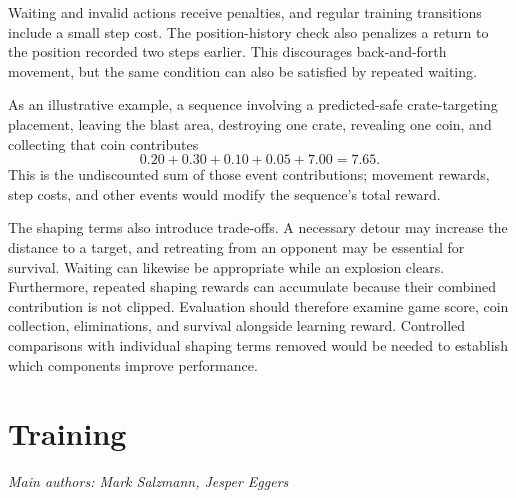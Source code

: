 \documentclass[11pt,a4paper]{article}
\newcommand{\contributionauthors}[1]{{\small\textit{Main authors: #1}\par}}
\begin{document}
Waiting and invalid actions receive penalties, and regular training
transitions include a small step cost. The position-history check
also penalizes a return to the position recorded two steps earlier.
This discourages back-and-forth movement, but the same condition can
also be satisfied by repeated waiting.

As an illustrative example, a sequence involving a predicted-safe
crate-targeting placement, leaving the blast area, destroying one
crate, revealing one coin, and collecting that coin contributes
\[
0.20 + 0.30 + 0.10 + 0.05 + 7.00 = 7.65.
\]
This is the undiscounted sum of those event contributions; movement
rewards, step costs, and other events would modify the sequence's
total reward.

The shaping terms also introduce trade-offs. A necessary detour may
increase the distance to a target, and retreating from an opponent
may be essential for survival. Waiting can likewise be appropriate
while an explosion clears. Furthermore, repeated shaping rewards
can accumulate because their combined contribution is not clipped.
Evaluation should therefore examine game score, coin collection,
eliminations, and survival alongside learning reward. Controlled
comparisons with individual shaping terms removed would be needed
to establish which components improve performance.

\FloatBarrier


\FloatBarrier
\begingroup\let\section\subsection\let\subsection\subsubsection
\endgroup
\section{Training}\label{sec:training}
\contributionauthors{Mark Salzmann, Jesper Eggers}
\end{document}
